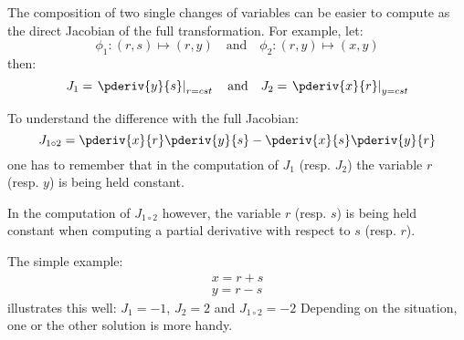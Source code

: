 The composition of two single changes of variables can be easier to compute as the direct
Jacobian of the full transformation. For example, let:
\[ \phi_1 : (r, s) \mapsto (r, y) \quad \textrm{and} \quad \phi_2: (r,y)\mapsto(x,y)\]
then:
\[ J_1 = \left. \pderiv{y}{s} \right|_{r=cst} \quad \textrm{and} \quad
 J_2 = \left.\pderiv{x}{r}\right|_{y=cst}\]

To understand the difference with the full Jacobian:
\[ J_{1 \circ 2} = \pderiv{x}{r} \pderiv{y}{s} - \pderiv{x}{s} \pderiv{y}{r}\]
one has to remember that in the computation of $J_1$ (resp. $J_2$) the variable $r$
(resp. $y$) is being held constant.

In the computation of $J_{1 \circ 2}$ however,
the variable $r$ (resp. $s$) is being held constant when computing a partial derivative
with respect to $s$ (resp. $r$).

The simple example:
\begin{eqnarray*}
x  = r+s \\
y  = r-s
\end{eqnarray*}
illustrates this well: $J_1 = -1$, $J_2=2$ and $J_{1\circ2}= -2$
Depending on the situation, one or the other solution is more handy.

